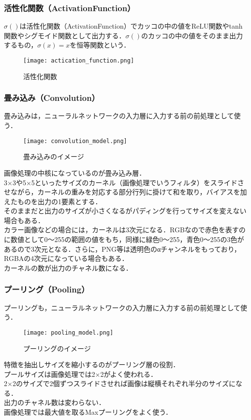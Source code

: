 \documentclass[uplatex,titlepage]{jsarticle}
\begin{document}
\subsubsection{活性化関数（ActivationFunction）}
$\sigma()$は活性化関数（ActivationFunction）でカッコの中の値をReLU関数やtanh関数やシグモイド関数として出力する．$\sigma()$のカッコの中の値をそのまま出力するもの，$\sigma(x)=x$を恒等関数という．
\begin{figure}[H]%
    \begin{center}
    \texttt{[image: actication\_function.png]} 
    \caption{活性化関数}
    \end{center}
\end{figure}

\subsubsection{畳み込み（Convolution）}
畳み込みは，ニューラルネットワークの入力層に入力する前の前処理として使う．
\begin{figure}[H]%
    \begin{center}
    \texttt{[image: convolution\_model.png]} 
    \caption{畳み込みのイメージ}
    \end{center}
\end{figure}
画像処理の中核になっているのが畳み込み層．\\
3×3や5×5といったサイズのカーネル（画像処理でいうフィルタ）をスライドさせながら，カーネルの重みを対応する部分行列に掛けて和を取り，バイアスを加えたものを出力の1要素とする．\\
そのままだと出力のサイズが小さくなるがパディングを行ってサイズを変えない場合もある．\\
カラー画像などの場合には，カーネルは3次元になる．RGBなので赤色を表すのに数値として0～255の範囲の値をもち，同様に緑色0～255，青色0～255の3色があるので3次元となる．さらに，PNG等は透明色のαチャンネルをもっており，RGBAの4次元になっている場合もある．\\
カーネルの数が出力のチャネル数になる．

\subsubsection{プーリング（Pooling）}
プーリングも，ニューラルネットワークの入力層に入力する前の前処理として使う．
\begin{figure}[H]%
    \begin{center}
    \texttt{[image: pooling\_model.png]} 
    \caption{プーリングのイメージ}
    \end{center}
\end{figure}
特徴を抽出しサイズを縮小するのがプーリング層の役割．\\
プールサイズは画像処理では2×2がよく使われる．\\
2×2のサイズで2個ずつスライドさせれば画像は縦横それぞれ半分のサイズになる．\\
出力のチャネル数は変わらない．\\
画像処理では最大値を取るMaxプーリングをよく使う．
\end{document}
